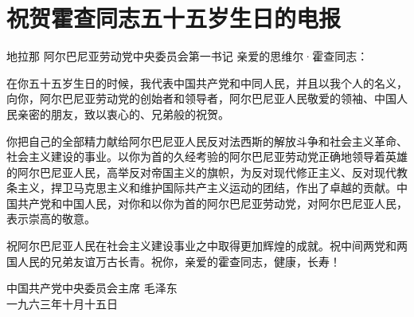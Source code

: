 \section[祝贺霍查同志五十五岁生日的电报（一九六三年十月十五日）]{祝贺霍查同志五十五岁生日的电报}

地拉那
阿尔巴尼亚劳动党中央委员会第一书记
亲爱的思维尔·霍查同志：

在你五十五岁生日的时候，我代表中国共产党和中同人民，并且以我个人的名义，向你，阿尔巴尼亚劳动党的创始者和领导者，阿尔巴尼亚人民敬爱的领袖、中国人民亲密的朋友，致以衷心的、兄弟般的祝贺。

你把自己的全部精力献给阿尔巴尼亚人民反对法西斯的解放斗争和社会主义革命、社会主义建设的事业。以你为首的久经考验的阿尔巴尼亚劳动党正确地领导着英雄的阿尔巴尼亚人民，高举反对帝国主义的旗帜，为反对现代修正主义、反对现代教条主义，捍卫马克思主义和维护国际共产主义运动的团结，作出了卓越的贡献。中国共产党和中国人民，对你和以你为首的阿尔巴尼亚劳动党，对阿尔巴尼亚人民，表示崇高的敬意。

祝阿尔巴尼亚人民在社会主义建设事业之中取得更加辉煌的成就。祝中间两党和两国人民的兄弟友谊万古长青。祝你，亲爱的霍查同志，健康，长寿！

{\raggedleft 中国共产党中央委员会主席 毛泽东\\一九六三年十月十五日\par}
